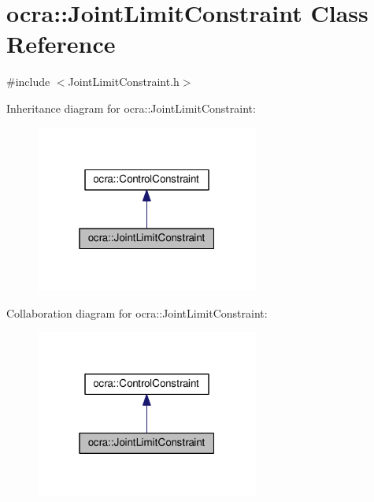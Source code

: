 \hypertarget{classocra_1_1JointLimitConstraint}{}\section{ocra\+:\+:Joint\+Limit\+Constraint Class Reference}
\label{classocra_1_1JointLimitConstraint}


{\ttfamily \#include $<$Joint\+Limit\+Constraint.\+h$>$}



Inheritance diagram for ocra\+:\+:Joint\+Limit\+Constraint\+:
\nopagebreak
\begin{figure}[H]
\begin{center}
\leavevmode
\includegraphics[width=208pt]{d8/d70/classocra_1_1JointLimitConstraint__inherit__graph}
\end{center}
\end{figure}


Collaboration diagram for ocra\+:\+:Joint\+Limit\+Constraint\+:
\nopagebreak
\begin{figure}[H]
\begin{center}
\leavevmode
\includegraphics[width=208pt]{d1/dd3/classocra_1_1JointLimitConstraint__coll__graph}
\end{center}
\end{figure}
